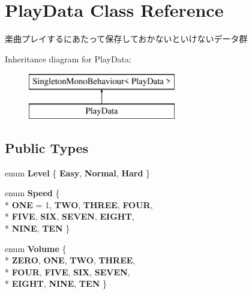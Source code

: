\hypertarget{class_play_data}{}\section{Play\+Data Class Reference}
\label{class_play_data}


楽曲プレイするにあたって保存しておかないといけないデータ群  


Inheritance diagram for Play\+Data\+:\begin{figure}[H]
\begin{center}
\leavevmode
\includegraphics[height=2.000000cm]{class_play_data}
\end{center}
\end{figure}
\subsection*{Public Types}
\begin{DoxyCompactItemize}
\item 
enum {\bfseries Level} \{ {\bfseries Easy}, 
{\bfseries Normal}, 
{\bfseries Hard}
 \}\hypertarget{class_play_data_a3561a38cd6b282fd2f39b0e0c458c032}{}\label{class_play_data_a3561a38cd6b282fd2f39b0e0c458c032}

\item 
enum {\bfseries Speed} \{ \\*
{\bfseries O\+NE} = 1, 
{\bfseries T\+WO}, 
{\bfseries T\+H\+R\+EE}, 
{\bfseries F\+O\+UR}, 
\\*
{\bfseries F\+I\+VE}, 
{\bfseries S\+IX}, 
{\bfseries S\+E\+V\+EN}, 
{\bfseries E\+I\+G\+HT}, 
\\*
{\bfseries N\+I\+NE}, 
{\bfseries T\+EN}
 \}\hypertarget{class_play_data_a5273921272a1cf4ea28646ea538b48f4}{}\label{class_play_data_a5273921272a1cf4ea28646ea538b48f4}

\item 
enum {\bfseries Volume} \{ \\*
{\bfseries Z\+E\+RO}, 
{\bfseries O\+NE}, 
{\bfseries T\+WO}, 
{\bfseries T\+H\+R\+EE}, 
\\*
{\bfseries F\+O\+UR}, 
{\bfseries F\+I\+VE}, 
{\bfseries S\+IX}, 
{\bfseries S\+E\+V\+EN}, 
\\*
{\bfseries E\+I\+G\+HT}, 
{\bfseries N\+I\+NE}, 
{\bfseries T\+EN}
 \}\hypertarget{class_play_data_a879920467d76bd3a858c9c2025e98659}{}\label{class_play_data_a879920467d76bd3a858c9c2025e98659}

\end{DoxyCompactItemize}
